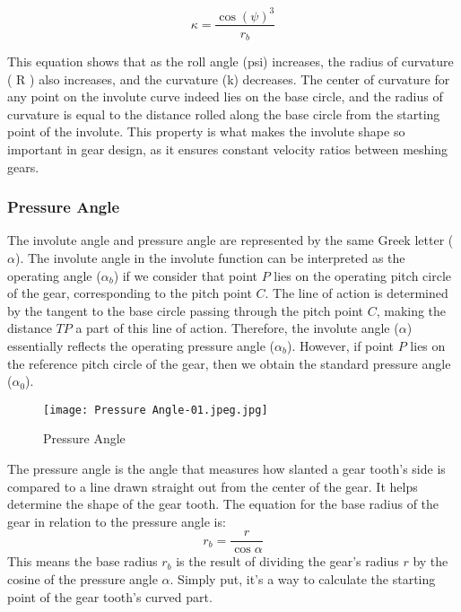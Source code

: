 \documentclass{article}
\begin{document}
\begin{equation}
    \kappa = \frac{{\cos(\psi)}^3}{r_b}
\end{equation}

This equation shows that as the roll angle (psi) increases, the radius of curvature ( R ) also increases, and the curvature (k) decreases. The center of curvature for any point on the involute curve indeed lies on the base circle, and the radius of curvature is equal to the distance rolled along the base circle from the starting point of the involute. This property is what makes the involute shape so important in gear design, as it ensures constant velocity ratios between meshing gears.

\subsubsection{Pressure Angle}
The involute angle and pressure angle are represented by the same Greek letter ($\alpha$). The involute angle in the involute function can be interpreted as the operating angle ($\alpha_b$) if we consider that point $P$ lies on the operating pitch circle of the gear, corresponding to the pitch point $C$. The line of action is determined by the tangent to the base circle passing through the pitch point $C$, making the distance $TP$ a part of this line of action. Therefore, the involute angle ($\alpha$) essentially reflects the operating pressure angle ($\alpha_b$). However, if point $P$ lies on the reference pitch circle of the gear, then we obtain the standard pressure angle ($\alpha_0$).
\begin{figure}[h]
    \centering
    \texttt{[image: Pressure Angle-01.jpeg.jpg]}
    \caption{Pressure Angle \cite{Calculation-of-involute-gears-6}}
    \label{fig:enter-label}
\end{figure}
The pressure angle is the angle that measures how slanted a gear tooth’s side is compared to a line drawn straight out from the center of the gear\cite{ChadGlinsky10}. It helps determine the shape of the gear tooth. The equation for the base radius of the gear in relation to the pressure angle is:
\begin{equation}
    r_b=\frac{r}{\cos{\alpha}}
\end{equation}
This means the base radius \( r_b \) is the result of dividing the gear’s radius \( r \) by the cosine of the pressure angle \( \alpha \). Simply put, it’s a way to calculate the starting point of the gear tooth’s curved part.
\end{document}
